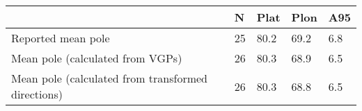 \begin{tabular}{lllll}
\toprule
{} &   N &  Plat &  Plon &  A95 \\
\midrule
Reported mean pole                                 &  25 &  80.2 &  69.2 &  6.8 \\
Mean pole (calculated from VGPs)                   &  26 &  80.3 &  68.9 &  6.5 \\
Mean pole (calculated from transformed directions) &  26 &  80.3 &  68.8 &  6.5 \\
\bottomrule
\end{tabular}
